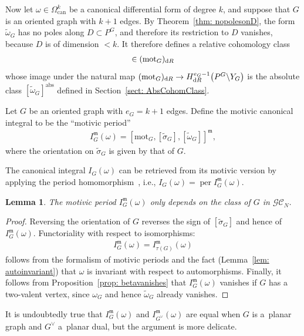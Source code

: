 \documentclass[pdftex]{sigma}%
\newtheorem{lem}[thm]{Lemma}
\numberwithin{equation}{section}
\newcommand{\GC}{\mathcal{GC}}
\newcommand{\can}{\mathrm{can}}
\newcommand{\mm}{\mathfrak{m}}
\newcommand{\0}{\color{blue}{\mathsf{0}}}
\begin{document}
Now let $\omega\in \Omega^k_{\can}$ be a canonical differential form of degree $k$, and suppose that $G$ is an oriented graph with $k+1$ edges.
By Theorem~\ref{thm: nopolesonD}, the form $\widetilde{\omega}_G$ has no poles along $D\subset P^G$, and therefore its restriction to $D$ vanishes, because $D$ is of dimension $<k$.
 It therefore defines a relative cohomology class
\begin{gather*}
[\widetilde{\omega}_G] \in (\mathrm{mot}_G)_{{\rm d}R}
\end{gather*}
whose image under the natural map $(\mathrm{mot}_G)_{{\rm d}R} \rightarrow H_{{\rm d}R}^{e_G-1} \big( P^G \backslash Y_G\big)$ is the absolute class $[\widetilde{\omega}_G]^{\mathrm{abs}}$ defined in Section~\ref{sect: AbsCohomClass}.
\begin{defn} Let $G$ be an oriented graph with $e_G= k+1$ edges.
Define the motivic canonical integral to be the ``motivic period'' \cite{NotesMot}
 \begin{gather*} %
 I_G^{\mm}(\omega) = [\mathrm{mot}_G, [\widetilde{\sigma}_G], [\widetilde{\omega}_G]]^{\mm},
 \end{gather*}
 where the orientation on $\widetilde{\sigma}_G$ is given by that of $G$.
 \end{defn}

The canonical integral $I_G(\omega)$ can be retrieved from its motivic version by applying the period homomorphism~\cite{NotesMot}, i.e., $I_G(\omega) =\operatorname{per} I^{\mm}_G(\omega)$.

\begin{lem}
The motivic period $I^{\mm}_G(\omega)$ only depends on the class of $G$ in $\GC_N$.
 \end{lem}
\begin{proof}
Reversing the orientation of $G$ reverses the sign of $[\widetilde{\sigma}_G]$ and hence of $I^{\mm}_G(\omega)$. Functoriality with respect to isomorphisms:
\begin{gather*}
I^{\mm}_G(\omega) = I^{\mm}_{\tau(G)} (\omega)
\end{gather*}
 follows from the formalism of motivic periods and the fact (Lemma~\ref{lem: autoinvariant}) that $\omega$ is invariant with respect to automorphisms. Finally, it follows from Proposition~\ref{prop: betavanishes} that $I^{\mm}_G(\omega)$ vanishes if $G$ has a two-valent vertex, since $\omega_G$ and hence $\widetilde{\omega}_G$ already vanishes.
\end{proof}

 It is undoubtedly true that $I^{\mm}_G(\omega)$ and $I^{\mm}_{G^{\vee}}(\omega)$ are equal when $G$ is a~planar graph and $G^{\vee}$ a~planar dual, but the argument is more delicate.
\end{document}
